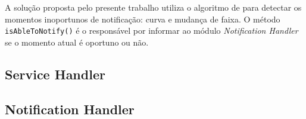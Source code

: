 A solução proposta pelo presente trabalho utiliza o algoritmo de  para detectar os momentos inoportunos de notificação: curva
e mudança de faixa. O método \lstinline[basicstyle=\ttfamily\color{black}]|isAbleToNotify()| é o responsável por informar ao módulo \textit{Notification Handler}
se o momento atual é oportuno ou não.

\subsection{Service Handler}
\label{service-handler}

\subsection{Notification Handler}
\label{notification-handler}
